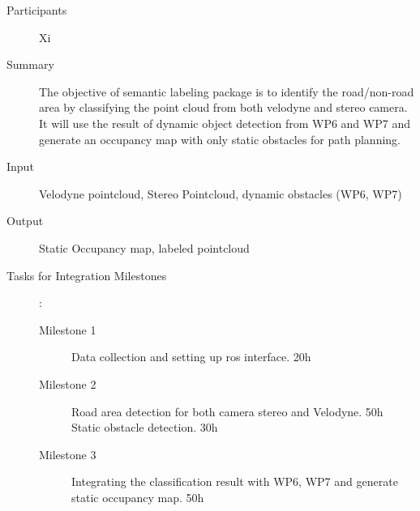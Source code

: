 \documentclass[11pt,a4paper]{article}
\begin{document}
\begin{description}
\item[Participants] Xi
\item[Summary]
The objective of semantic labeling package is to identify the road/non-road area by classifying the point cloud from both velodyne and stereo camera. It will use the result of dynamic object detection from WP6 and WP7 and generate an occupancy map with only static obstacles for path planning. 
\item[Input]
Velodyne pointcloud, Stereo Pointcloud, dynamic obstacles (WP6, WP7)
\item[Output]
Static Occupancy map, labeled pointcloud
\item[Tasks for Integration Milestones]:\
\begin{description}
\item[Milestone 1]
Data collection and setting up ros interface. 20h
\item[Milestone 2]
Road area detection for both camera stereo and Velodyne. 50h\\ 

Static obstacle detection. 30h
\item[Milestone 3] 
Integrating the classification result with WP6, WP7 and generate static occupancy map. 50h
\end{description}  
\end{description}​
\end{document}
